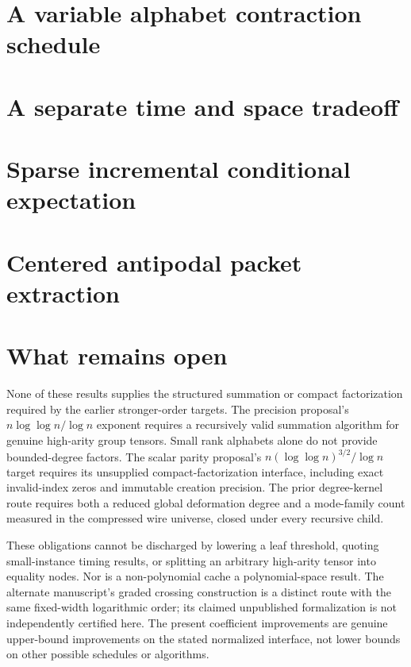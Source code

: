 \documentclass[11pt,letterpaper]{article}
\theoremstyle{remark}\newtheorem{remark}[theorem]{Remark}
\begin{document}
\section{A variable alphabet contraction schedule}\label{sec:frontier}


\section{A separate time and space tradeoff}\label{sec:cache}


\section{Sparse incremental conditional expectation}\label{sec:balancing}


\section{Centered antipodal packet extraction}\label{sec:packet}


\section{What remains open}\label{sec:open}
None of these results supplies the structured summation or compact factorization required by the earlier stronger-order targets. The precision proposal's $n\log\log n/\log n$ exponent requires a recursively valid summation algorithm for genuine high-arity group tensors. Small rank alphabets alone do not provide bounded-degree factors. The scalar parity proposal's $n(\log\log n)^{3/2}/\log n$ target requires its unsupplied compact-factorization interface, including exact invalid-index zeros and immutable creation precision. The prior degree-kernel route requires both a reduced global deformation degree and a mode-family count measured in the compressed wire universe, closed under every recursive child.

These obligations cannot be discharged by lowering a leaf threshold, quoting small-instance timing results, or splitting an arbitrary high-arity tensor into equality nodes. Nor is a non-polynomial cache a polynomial-space result. The alternate manuscript's graded crossing construction is a distinct route with the same fixed-width logarithmic order; its claimed unpublished formalization is not independently certified here. The present coefficient improvements are genuine upper-bound improvements on the stated normalized interface, not lower bounds on other possible schedules or algorithms.
\end{document}
